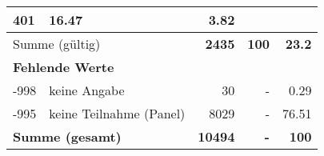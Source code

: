 \begin{longtable}{lXrrr}
       \num{401} &
       \num[round-mode=places,round-precision=2]{16.47} &
         \num[round-mode=places,round-precision=2]{3.82} \\
     \midrule
     \multicolumn{2}{l}{Summe (gültig)} &
       \textbf{\num{2435}} &
     \textbf{\num{100}} &
       \textbf{\num[round-mode=places,round-precision=2]{23.2}} \\
     \multicolumn{5}{l}{\textbf{Fehlende Werte}}\\
       -998 &
       keine Angabe &
         \num{30} &
        - &
         \num[round-mode=places,round-precision=2]{0.29} \\
       -995 &
       keine Teilnahme (Panel) &
         \num{8029} &
        - &
         \num[round-mode=places,round-precision=2]{76.51} \\
     \midrule
     \multicolumn{2}{l}{\textbf{Summe (gesamt)}} &
          \textbf{\num{10494}} &
        \textbf{-} &
        \textbf{\num{100}} \\
     \bottomrule
     \end{longtable}
     
